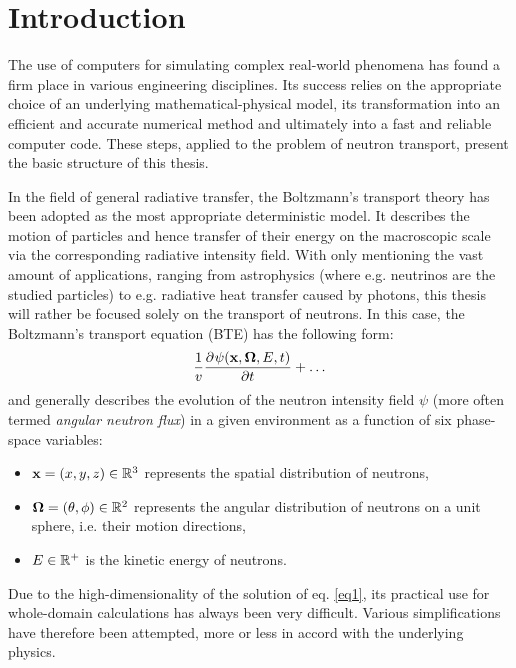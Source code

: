 \chapter{Introduction}

\ifpdf
    \graphicspath{{1_introduction/figures/PNG/}{1_introduction/figures/PDF/}{1_introduction/figures/}}
\else
    \graphicspath{{1_introduction/figures/EPS/}{1_introduction/figures/}}
\fi


The use of computers for simulating complex real-world phenomena has found a firm
place in various engineering disciplines. Its success relies on the appropriate choice of an underlying mathematical-physical
model, its transformation into an efficient and accurate numerical method and ultimately into a fast and reliable computer
code. These steps, applied to the problem of neutron transport, present the basic structure of this thesis.

In the field of general radiative transfer, the Boltzmann's transport theory has been adopted as the most appropriate deterministic model. It describes the motion of particles and hence transfer of their energy on the macroscopic scale via the corresponding radiative intensity field. With only mentioning the vast amount of applications, ranging from astrophysics (where e.g. neutrinos are the studied particles) to e.g. radiative heat transfer caused by photons, this thesis will rather be focused solely on the transport of neutrons. In this case, the Boltzmann's transport equation (BTE) has the following form:
\begin{equation}\label{eq1}
  \frac1v \pd{\psi(\bx,\bomega,E,t)}{t} + \ldots
\end{equation}
and generally describes the evolution of the neutron intensity field $\psi$ (more often termed \textit{angular neutron flux}) in a given environment as a function of six phase-space variables:
\begin{itemize}
 	\item $\bx = (x,y,z) \in \R[3]$ represents the spatial distribution of neutrons,
 	\item $\bomega = (\theta, \phi) \in \R[2]$ represents the angular distribution of neutrons on a unit sphere, i.e. their motion directions,
 	\item $E\in \R[+]$ is the kinetic energy of neutrons.
\end{itemize} 
Due to the high-dimensionality of the solution of eq. \eqref{eq1}, its practical use for whole-domain calculations has always been very difficult. Various simplifications have therefore been attempted, more or less in accord with the underlying physics. 

